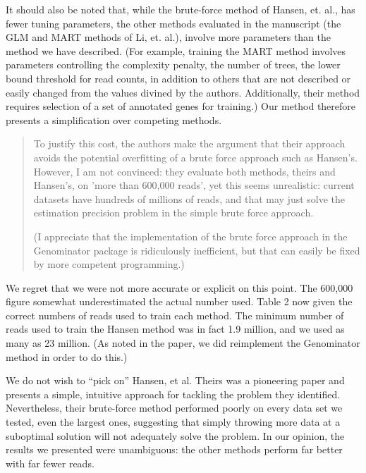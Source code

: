 \documentclass{article}
\begin{document}
It should also be noted that, while the brute-force method of Hansen, et. al.,
has fewer tuning parameters, the other methods evaluated in the manuscript (the
GLM and MART methods of Li, et. al.), involve more parameters than the method we
have described. (For example, training the MART method involves parameters
controlling the complexity penalty, the number of trees, the lower bound
threshold for read counts, in addition to others that are not described or
easily changed from the values divined by the authors.  Additionally, their
method requires selection of a set of annotated genes for training.)  Our method
therefore presents a simplification over competing methods.


\begin{quote}
To justify this cost, the
authors make the argument that their approach avoids the potential
overfitting of a brute force approach such as Hansen's. However, I am
not convinced: they evaluate both methods, theirs and Hansen's, on
'more than 600,000 reads', yet this seems unrealistic: current
datasets have hundreds of millions of reads, and that may just solve
the estimation precision problem in the simple brute force approach.

(I appreciate that the implementation of the brute force approach in
the Genominator package is ridiculously inefficient, but that can
easily be fixed by more competent programming.)
\end{quote}

We regret that we were not more accurate or explicit on this point. The 600,000
figure somewhat underestimated the actual number used. Table 2 now given the
correct numbers of reads used to train each method. The minimum number of reads
used to train the Hansen method was in fact 1.9 million, and we used as many as
23 million.  (As noted in the paper, we did reimplement the Genominator method
in order to do this.)

We do not wish to ``pick on'' Hansen, et al.  Theirs was a pioneering
paper and presents a simple, intuitive approach for tackling the
problem they identified.  Nevertheless, their brute-force method
performed poorly on every data set we tested, even the largest ones,
suggesting that simply throwing more data at a suboptimal solution
will not adequately solve the problem.  In our opinion, the results we
presented were unambiguous: the other methods perform far better with
far fewer reads.

\end{document}

